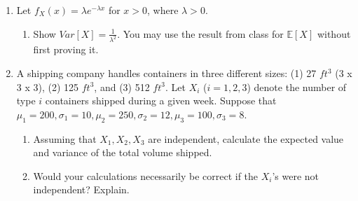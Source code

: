 \documentclass[12pt]{article}
\begin{document}
\begin{enumerate}


\item \label{Ch29ExpRV} Let $f_X(x)=\lambda e^{-\lambda x}$ for $x>0$, where $\lambda>0$. 
	\begin{enumerate}
	\item Show $Var[X]=\frac{1}{\lambda^2}$. You may use the result from class for $\mathbb{E}[X]$ without first proving it.
	\end{enumerate}

\item  \label{Ch29_SumsRV} A shipping company handles containers in three different sizes: (1) 27 $ft^3$ (3 x 3 x 3), (2) 125 $ft^3$, and (3) 512 $ft^3$. Let $X_i$ ($i =	1, 2, 3$) denote the number of type $i$ containers shipped during a given week. Suppose that $\mu_1 =200,\sigma_1=10,\mu_2 =250,\sigma_2=12,\mu_3 =100,\sigma_3=8$.

	\begin{enumerate}
	\item Assuming that $X_1,X_2,X_3$ are independent, calculate the expected value and variance of the total volume shipped.
	\item Would your calculations necessarily be correct if the $X_i$'s were not independent? Explain.   
	\end{enumerate}




\end{enumerate}
\end{document}
